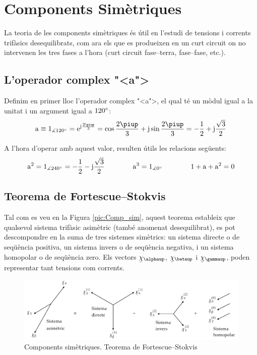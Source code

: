 \chapter{Components Sim\`{e}triques} 

La teoria de les components sim\`{e}triques \'{e}s \'{u}til en l'estudi de
tensions i corrents trif\`{a}sics
 desequilibrats, com ara els que es produeixen en un curt circuit on no intervenen les tres
 fases a l'hora (curt circuit fase--terra, fase--fase, etc.).

\section{L'operador complex {"<}a{">}}

Definim en primer lloc l'operador complex {"<}a{">}, el qual t\'{e} un m\`{o}dul
igual a la unitat i un argument igual a $120^\circ$: 
\begin{equation}
   \au \equiv 1_{\measuredangle 120\degree} = \eu^{\ju\frac{2\piup}{3}} =
   \cos \frac{2\piup}{3} + \ju \sin \frac{2\piup}{3} = - \frac{1}{2} + \ju \frac{\sqrt{3}}{2}
\end{equation}

A l'hora d'operar amb aquest valor, resulten \'{u}tils les relacions
seg\"{u}ents:
\begin{equation}
   \mathrm{a}^2 = 1_{\measuredangle 240^\circ}= - \frac{1}{2} - \mathrm{j} \frac{\sqrt{3}}{2}\qquad\qquad
   \mathrm{a}^3 = 1_{\measuredangle 0^\circ} \qquad\qquad
   1+ \mathrm{a} + \mathrm{a}^2 = 0
\end{equation}

\section{\texorpdfstring{Teorema de Fortescue--Stokvis}{Teorema de Fortescue-Stokvis}}

Tal com es veu en la Figura \vref{pic:Comp_sim}, aquest teorema
estableix que qualsevol sistema trif\`{a}sic asim\`{e}tric (tamb\'{e} anomenat
desequilibrat),  es pot descompondre  en la suma de tres sistemes
sim\`{e}trics: un sistema directe o de seq\"{u}\`{e}ncia positiva, un sistema
invers o de seq\"{u}\`{e}ncia negativa, i un sistema homopolar o de
seq\"{u}\`{e}ncia zero. Els vectors $\cmplx{\chi}_\alphaup$,
$\cmplx{\chi}_\betaup$ i $\cmplx{\chi}_\gammaup$, poden representar tant
tensions com corrents.
\begin{figure}[h]
\centering
    \includegraphics{Imatges/Cap-CompSim-CompSim.pdf}
\caption{Components sim\`{e}triques. Teorema de Fortescue--Stokvis}
\label{pic:Comp_sim}
\end{figure}

